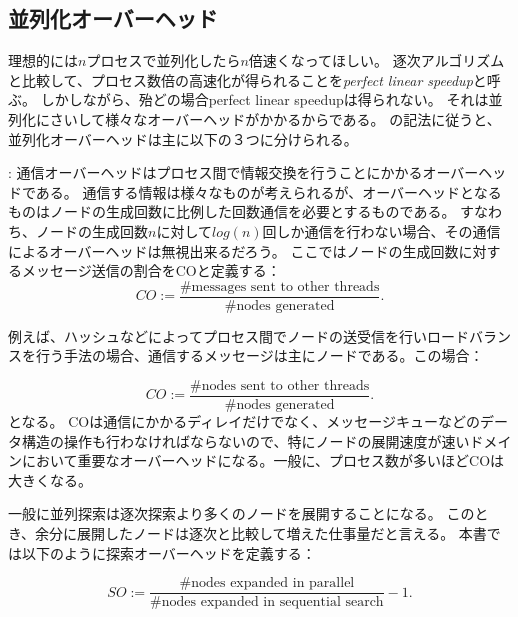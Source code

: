 \documentclass[b5paper]{report}
\begin{document}
\subsection{並列化オーバーヘッド}
\label{sec:parallel-overheads}

理想的には$n$プロセスで並列化したら$n$倍速くなってほしい。
逐次アルゴリズムと比較して、プロセス数倍の高速化が得られることを{\it perfect linear speedup}と呼ぶ。
しかしながら、殆どの場合perfect linear speedupは得られない。
それは並列化にさいして様々なオーバーヘッドがかかるからである。
\cite{jinnai2017work}の記法に従うと、並列化オーバーヘッドは主に以下の３つに分けられる。

:
通信オーバーヘッドはプロセス間で情報交換を行うことにかかるオーバーヘッドである。
通信する情報は様々なものが考えられるが、オーバーヘッドとなるものはノードの生成回数に比例した回数通信を必要とするものである。
すなわち、ノードの生成回数$n$に対して$log(n)$回しか通信を行わない場合、その通信によるオーバーヘッドは無視出来るだろう。
ここではノードの生成回数に対するメッセージ送信の割合をCOと定義する：
\begin{equation}
	CO := \frac{\text{\# messages sent to other threads}}{\text{\# nodes generated}}.
\end{equation}

例えば、ハッシュなどによってプロセス間でノードの送受信を行いロードバランスを行う手法の場合、通信するメッセージは主にノードである。この場合：

\begin{equation}
	CO := \frac{\text{\# nodes sent to other threads}}{\text{\# nodes generated}}.
\end{equation}
となる。
COは通信にかかるディレイだけでなく、メッセージキューなどのデータ構造の操作も行わなければならないので、特にノードの展開速度が速いドメインにおいて重要なオーバーヘッドになる。一般に、プロセス数が多いほどCOは大きくなる。


一般に並列探索は逐次探索より多くのノードを展開することになる。
このとき、余分に展開したノードは逐次と比較して増えた仕事量だと言える。
本書では以下のように探索オーバーヘッドを定義する：

\begin{equation}
SO := \frac{\text{\# nodes expanded in parallel}}{\text{\#nodes expanded in sequential search}} - 1.
\end{equation}
\end{document}
